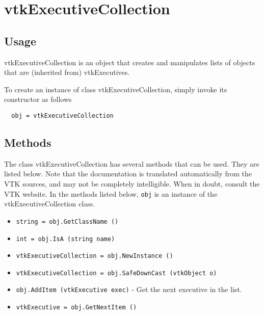 \section{vtkExecutiveCollection}

\subsection{Usage}

 vtkExecutiveCollection is an object that creates and manipulates lists of
 objects that are (inherited from) vtkExecutives.

To create an instance of class vtkExecutiveCollection, simply
invoke its constructor as follows
\begin{verbatim}
  obj = vtkExecutiveCollection
\end{verbatim}
\subsection{Methods}

The class vtkExecutiveCollection has several methods that can be used.
  They are listed below.
Note that the documentation is translated automatically from the VTK sources,
and may not be completely intelligible.  When in doubt, consult the VTK website.
In the methods listed below, \verb|obj| is an instance of the vtkExecutiveCollection class.
\begin{itemize}
\item  \verb|string = obj.GetClassName ()|

\item  \verb|int = obj.IsA (string name)|

\item  \verb|vtkExecutiveCollection = obj.NewInstance ()|

\item  \verb|vtkExecutiveCollection = obj.SafeDownCast (vtkObject o)|

\item  \verb|obj.AddItem (vtkExecutive exec)| -  Get the next executive in the list.

\item  \verb|vtkExecutive = obj.GetNextItem ()|

\end{itemize}
